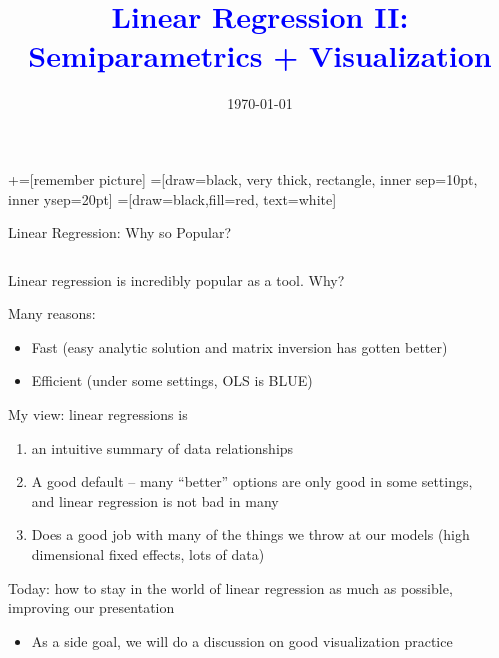\documentclass[notes,11pt, aspectratio=169]{beamer}
\title[]{\textcolor{blue}{Linear Regression II: Semiparametrics + Visualization}}
\author[PGP]{}
\institute[FRBNY]{\small{Paul Goldsmith-Pinkham}}
\date{\today}
\newenvironment{wideitemize}{\itemize\addtolength{\itemsep}{10pt}}{\enditemize}
\begin{document}
\newcommand\marktopleft[1]{%
    \tikz[overlay,remember picture] 
        \node (marker-#1-a) at (-.3em,.3em) {};%
}
\newcommand\markbottomright[2]{%
    \tikz[overlay,remember picture] 
        \node (marker-#1-b) at (0em,0em) {};%
}
+=[remember picture] 
 =[draw=black, very thick, rectangle, inner sep=10pt, inner ysep=20pt]
 =[draw=black,fill=red, text=white]

\begin{frame}
\maketitle

\end{frame}

\begin{frame}{Linear Regression: Why so Popular?}
\begin{columns}[T] %
\begin{column}{.8\textwidth}
  \begin{wideitemize}
  \item Linear regression is incredibly popular as a tool. Why? 
  \item Many reasons:
    \begin{itemize}
    \item Fast (easy analytic solution and matrix inversion has gotten better)
    \item Efficient (under some settings, OLS is BLUE)
    \end{itemize}
  \item My view: linear regressions is
    \begin{enumerate}
    \item an intuitive summary of data relationships
    \item A good default -- many ``better'' options are only good in
      some settings, and linear regression is not bad in many
    \item Does a good job with many of the things we throw at our
      models (high dimensional fixed effects, lots of data)
    \end{enumerate}
  \item Today: how to stay in the world of linear regression as much
    as possible, improving our presentation
    \begin{itemize}
    \item As a side goal, we will do a discussion on good visualization practice
    \end{itemize}
  \end{wideitemize}
  \end{column}%
  \hfill%
  \begin{column}{.5\textwidth}
  \end{column}
\end{columns}
\end{frame}
\end{document}
